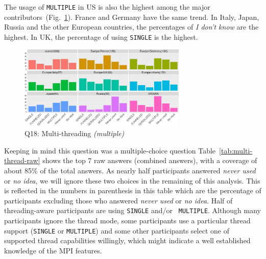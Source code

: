 \documentclass[preprint,5p,times]{elsarticle}
\def\myquote#1{{\it #1}}
\def\mcountries{major contributors\xspace{}}%
\begin{document}
The usage of {\tt MULTIPLE} in US is also the highest among the
\mcountries\  (Fig.~\ref{fig:multi-thread}). France and Germany have
the same trend. In Italy, Japan, Russia and the
other European countries, the percentages of \myquote{I don't know}
are the highest. In UK, the percentage of using {\tt SINGLE} is the
highest.

\begin{figure}[htb]
  \begin{center}
    \includegraphics[width=8.0cm]{R-scripts/Q18.pdf}
    \vspace{-2mm}
    \caption{Q18: Multi-threading {\it(multiple)}}
    \label{fig:multi-thread}
  \end{center}
\end{figure}

Keeping in mind this question was a multiple-choice question
Table~\ref{tab:multi-thread-raw} shows the top 7 raw answers (combined answers),
with a coverage of about 85\% of the total answers.
As nearly half participants answered \myquote{never used} or \myquote{no idea},
we will ignore these two choices in the remaining of this analysis. This is
reflected in the numbers in parenthesis in this table which are the percentage
of participants excluding those who answered \myquote{never used} or \myquote{no
idea}. Half of threading-aware participants are using {\tt SINGLE} and/or {\tt
MULTIPLE}. Although many participants ignore the thread mode, some participants
use a particular thread support ({\tt SINGLE} or {\tt MULTIPLE}) and some other
participants select one of supported thread capabilities willingly, which might
indicate a well established knowledge of the MPI features.
\end{document}
